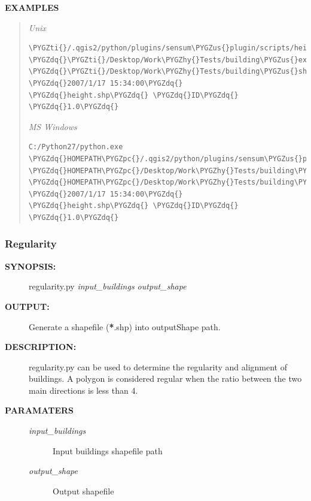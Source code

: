 \documentclass[letterpaper,10pt,english]{sphinxmanual}
\def\PYGZus{\char`\_}
\def\PYGZpc{\char`\%}
\def\PYGZhy{\char`\-}
\def\PYGZdq{\char`\"}
\def\PYGZti{\char`\~}
\begin{document}
\textbf{EXAMPLES}
\begin{quote}

\emph{Unix}

\begin{Verbatim}[frame=single,commandchars=\\\{\}]
\PYGZti{}/.qgis2/python/plugins/sensum\PYGZus{}plugin/scripts/height.py \PYGZdq{}\PYGZti{}/Desktop/Work\PYGZhy{}Tests/building\PYGZus{}extraction.shp\PYGZdq{} \PYGZdq{}\PYGZti{}/Desktop/Work\PYGZhy{}Tests/building\PYGZus{}shadows.shp\PYGZdq{} \PYGZdq{}2007/1/17 15:34:00\PYGZdq{} \PYGZdq{}height.shp\PYGZdq{} \PYGZdq{}ID\PYGZdq{} \PYGZdq{}1.0\PYGZdq{}
\end{Verbatim}

\emph{MS Windows}

\begin{Verbatim}[frame=single,commandchars=\\\{\}]
C:/Python27/python.exe \PYGZdq{}HOMEPATH\PYGZpc{}/.qgis2/python/plugins/sensum\PYGZus{}plugin/scripts/height.py\PYGZdq{} \PYGZdq{}HOMEPATH\PYGZpc{}/Desktop/Work\PYGZhy{}Tests/building\PYGZus{}extraction.shp\PYGZdq{} \PYGZdq{}HOMEPATH\PYGZpc{}/Desktop/Work\PYGZhy{}Tests/building\PYGZus{}shadows.shp\PYGZdq{} \PYGZdq{}2007/1/17 15:34:00\PYGZdq{} \PYGZdq{}height.shp\PYGZdq{} \PYGZdq{}ID\PYGZdq{} \PYGZdq{}1.0\PYGZdq{}
\end{Verbatim}
\end{quote}


\subsubsection{Regularity}
\label{user:regularity}\begin{description}
\item[{\textbf{SYNOPSIS:}}] \leavevmode
regularity.py \emph{input\_buildings output\_shape}

\item[{\textbf{OUTPUT:}}] \leavevmode
Generate a shapefile ({\color{red}\bfseries{}*}.shp) into outputShape path.

\item[{\textbf{DESCRIPTION:}}] \leavevmode
regularity.py can be used to determine the regularity and alignment of buildings. A polygon is considered regular when the ratio between the two main directions is less than 4.

\item[{\textbf{PARAMATERS}}] \leavevmode\begin{description}
\item[{\emph{input\_buildings}}] \leavevmode
Input buildings shapefile path

\item[{\emph{output\_shape}}] \leavevmode
Output shapefile

\end{description}

\end{description}
\end{document}
